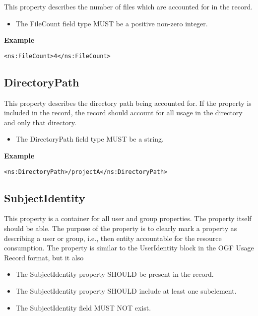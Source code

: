 This property describes the number of files which are accounted for in the
record.

\begin{itemize}
\item The FileCount field type MUST be a positive non-zero integer.
\end{itemize}

{\bf Example}
\begin{verbatim}
<ns:FileCount>4</ns:FileCount>
\end{verbatim}



\subsection{DirectoryPath}

This property describes the directory path being accounted for. If the property
is included in the record, the record should account for all usage in the
directory and only that directory.


\begin{itemize}
\item The DirectoryPath field type MUST be a string.
\end{itemize}

{\bf Example}
\begin{verbatim}
<ns:DirectoryPath>/projectA</ns:DirectoryPath>
\end{verbatim}



\subsection{SubjectIdentity}

This property is a container for all user and group properties. The property
itself should be able. The purpose of the property is to clearly mark a
property as describing a user or group, i.e., then entity accountable for the
resource consumption. The property is similar to the UserIdentity block in the
OGF Usage Record format, but it also

\begin{itemize}
\item The SubjectIdentity property SHOULD be present in the record.
\item The SubjectIdentity property SHOULD include at least one subelement.
\item The SubjectIdentity field MUST NOT exist.
\end{itemize}

